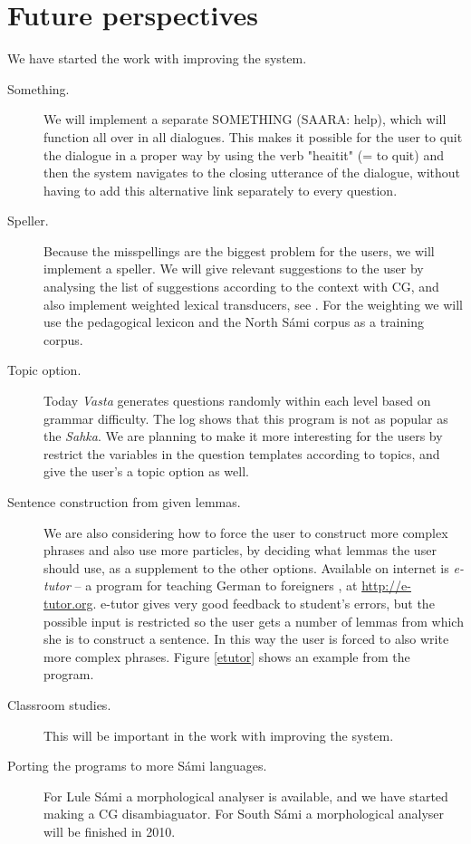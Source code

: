 \documentclass[11pt]{article}
\begin{document}
\section{Future perspectives}
We have started the work with improving the system.
\begin{description}
\item [Something.] We will implement a separate SOMETHING (SAARA: help), which will function all over in all dialogues. This makes it possible for the user to quit the dialogue in a proper way by using the verb "heaitit" (= to quit) and then the system navigates to the closing utterance of the dialogue, without having to add this alternative link separately to every question. 
\item [Speller.] Because the misspellings are the biggest problem for the users, we will implement a speller. We will give relevant suggestions to the user by analysing the list of suggestions according to the context with CG, and also implement weighted lexical transducers, see \cite{Linden:09}. For the weighting we will use the pedagogical lexicon and the North Sámi corpus as a training corpus.
\item [Topic option.] Today \textit{Vasta} generates questions randomly within each level based on grammar difficulty. The log shows that this program is not as popular as the \textit{Sahka}. We are planning to make it more interesting for the users by restrict the variables in the question templates according to topics, and give the user's a topic option as well.
\item [Sentence construction from given lemmas.] We are also considering how to force the user to construct more complex phrases and also use more particles, by deciding what lemmas the user should use, as a supplement to the other options. Available on internet is \textit{e-tutor} -- a program for teaching German to foreigners \cite{Heift:01,Heift:02}, at \url{http://e-tutor.org}. e-tutor gives very good feedback to student's errors, but the possible input is restricted so the user gets a number of lemmas from which she is to construct a sentence. In this way the user is forced to also write more complex phrases. Figure \ref{etutor} shows an example from the program.
\item [Classroom studies.] This will be important in the work with improving the system.
\item [Porting the programs to more Sámi languages.] For Lule Sámi a morphological analyser is available, and we have started making a CG disambiaguator. For South Sámi a morphological analyser will be finished in 2010. 
  \end{description} 
  \vspace{0.7cm}
\end{document}

